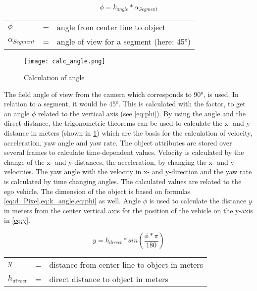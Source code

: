 \begin{equation}
\phi = k_{angle} * \alpha_{Segment}
\label{eq:phi}
\end{equation}
\begin{table}[!h]
	\begin{center}
		\begin{tabular}{l c l}
			$\phi$ & = & angle from center line to object\\
			$\alpha_{Segment}$ & = &  angle of view for a segment (here: \ang{45})\\
		\end{tabular}
	\end{center}
\end{table}

\begin{figure}[b]
	\centering
	\texttt{[image: calc\_angle.png]}
	\caption{Calculation of angle}
	\label{fig:anglecalculation}
\end{figure}

The field angle of view from the camera which corresponds to \ang{90}, is used. In relation to a segment, it would be \ang{45}. This is calculated with the factor, to get an angle $\phi$ related to the vertical axis (see \cref{eq:phi}).
By using the angle and the direct distance, the trigonometric theorems can be used to calculate the x- and y-distance in meters (shown in \cref{fig:anglecalculation}) which are the basis for the calculation of velocity, acceleration, yaw angle and yaw rate. The object attributes are stored over several frames to calculate time-dependent values. Velocity is calculated by the change of the x- and y-distances, the acceleration, by changing the x- and y-velocities. The yaw angle with the velocity in x- and y-direction and the yaw rate is calculated by time changing angles. The calculated values are related to the ego vehicle.
The dimension of the object is based on formulas \cref{eq:d_Pixel,eq:k_angle,eq:phi} as well. Angle $\phi$ is used to calculate the distance $y$ in meters from the center vertical axis for the position of the vehicle on the y-axis in \cref{eq:y}.

\begin{equation}
	y = h_{direct} * sin(\frac{\phi * \pi}{180})
	\label{eq:y}
\end{equation}
\begin{table}[!h]
	\begin{center}
		\begin{tabular}{l c l}
			$y$ & = & distance from center line to object in meters\\
			$h_{direct}$ & = &  direct distance to object in meters\\
		\end{tabular}
	\end{center}
\end{table}

